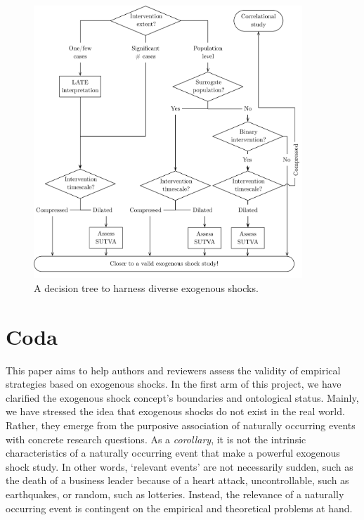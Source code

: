 \documentclass[11pt]{article}
\begin{document}
\begin{refsection}
\begin{figure}[!htbp]
  \centering
  \includegraphics[width=0.9\textwidth]{exhibits/harnessing_exogenous_shocks.pdf}
  \caption{A decision tree to harness diverse exogenous shocks.}
  \label{fig:harnessing_exogeneous_shocks}
\end{figure}


\section{Coda}
\label{sec:coda}

\noindent This paper aims to help authors and reviewers assess the validity of empirical strategies based on exogenous shocks. In the first arm of this project, we have clarified the exogenous shock concept's boundaries and ontological status. Mainly, we have stressed the idea that exogenous shocks do not exist in the real world. Rather, they emerge from the purposive association of naturally occurring events with concrete research questions.  As a \textit{corollary}, it is not the intrinsic characteristics of a naturally occurring event that make a powerful exogenous shock study. In other words, `relevant events' are not necessarily sudden, such as the death of a business leader because of a heart attack, uncontrollable, such as earthquakes, or random, such as lotteries.  Instead, the relevance of a naturally occurring event is contingent on the empirical and theoretical problems at hand. 


\end{refsection}
\end{document}
